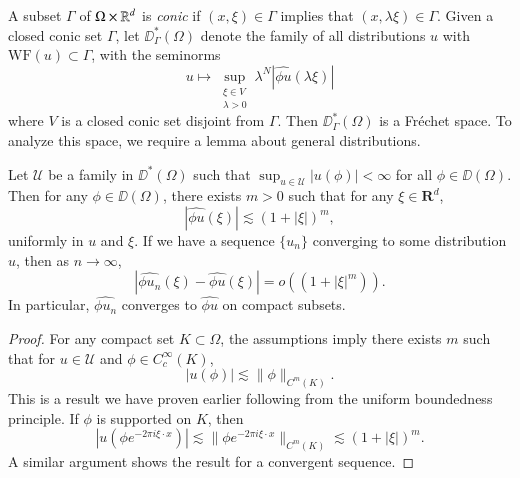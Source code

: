 A subset $\Gamma$ of $\Omega \times \operatorname{\mathbb{R}}^d$ is \emph{conic} if $(x,\xi) \in \Gamma$ implies that $(x,\lambda \xi) \in \Gamma$. Given a closed conic set $\Gamma$, let $\DD^*_\Gamma(\Omega)$ denote the family of all distributions $u$ with $\text{WF}(u) \subset \Gamma$, with the seminorms
%
\[ u \mapsto \sup_{\substack{\xi \in V\\\lambda > 0}} \lambda^N |\widehat{\phi u}(\lambda \xi)| \]
%
where $V$ is a closed conic set disjoint from $\Gamma$. Then $\DD^*_\Gamma(\Omega)$ is a Fr\'{e}chet space. To analyze this space, we require a lemma about general distributions.

\begin{lemma}
    Let $\mathcal{U}$ be a family in $\DD^*(\Omega)$ such that $\sup_{u \in \mathcal{U}} |u(\phi)| < \infty$ for all $\phi \in \DD(\Omega)$. Then for any $\phi \in \DD(\Omega)$, there exists $m > 0$ such that for any $\xi \in \mathbf{R}^d$,
    \[ |\widehat{\phi u}(\xi)| \lesssim (1 + |\xi|)^m, \]
    uniformly in $u$ and $\xi$. If we have a sequence $\{ u_n \}$ converging to some distribution $u$, then as $n \to \infty$,
    \[ |\widehat{\phi u_n}(\xi) - \widehat{\phi u}(\xi)| = o((1 + |\xi|^m)). \]
    In particular, $\widehat{\phi u_n}$ converges to $\widehat{\phi u}$ on compact subsets.
\end{lemma}
\begin{proof}
    For any compact set $K \subset \Omega$, the assumptions imply there exists $m$ such that for $u \in \mathcal{U}$ and $\phi \in C_c^\infty(K)$,
    \[ |u(\phi)| \lesssim \| \phi \|_{C^m(K)}. \]
    This is a result we have proven earlier following from the uniform boundedness principle. If $\phi$ is supported on $K$, then
    \[ |u(\phi e^{-2 \pi i \xi \cdot x})| \lesssim \| \phi e^{-2 \pi i \xi \cdot x} \|_{C^m(K)} \lesssim (1 + |\xi|)^m. \]
    A similar argument shows the result for a convergent sequence.
\end{proof}

